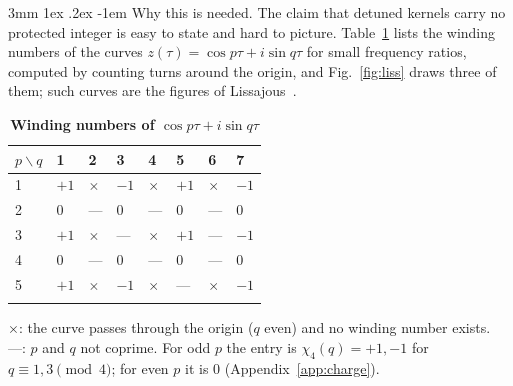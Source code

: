 \documentclass[%
 reprint, amsmath,amssymb, aps, prb, ]{revtex4-2}
\makeatletter
\numberwithin{equation}{section}
\renewcommand\paragraph{%
  \@startsection{paragraph}{4}{\z@}%
    {3mm \@plus 1ex \@minus .2ex}
    {-1em}
    {\normalfont\normalsize\itshape}}
\makeatother
\begin{document}
\paragraph{Why this is needed.} The claim that detuned kernels carry no protected integer is easy to state and hard to picture. Table~\ref{tab:wind} lists the winding numbers of the curves $z(\tau)=\cos p\tau+i\sin q\tau$ for small frequency ratios, computed by counting turns around the origin, and Fig.~\ref{fig:liss} draws three of them; such curves are the figures of Lissajous~\cite{ref:lissajous}.

\begin{table}[t!]
\centering
\caption{\textbf{Winding numbers of $\cos p\tau+i\sin q\tau$}}
\label{tab:wind}
\renewcommand{\arraystretch}{1.3}
\begin{tabular}{p{2.2cm}p{1.6cm}p{1.6cm}p{1.6cm}p{1.6cm}p{1.6cm}p{1.6cm}p{1.6cm}}
\toprule
$p\backslash q$ & 1 & 2 & 3 & 4 & 5 & 6 & 7 \\
\midrule
1 & $+1$ & $\times$ & $-1$ & $\times$ & $+1$ & $\times$ & $-1$ \\
2 & $0$ & --- & $0$ & --- & $0$ & --- & $0$ \\
3 & $+1$ & $\times$ & --- & $\times$ & $+1$ & --- & $-1$ \\
4 & $0$ & --- & $0$ & --- & $0$ & --- & $0$ \\
5 & $+1$ & $\times$ & $-1$ & $\times$ & --- & $\times$ & $-1$ \\
\addlinespace[0.1cm]
\bottomrule
\end{tabular}
\vspace{0.2cm}
\begin{minipage}{0.95\textwidth}
\justifying\footnotesize
$\times$: the curve passes through the origin ($q$ even) and no winding number exists. ---: $p$ and $q$ not coprime. For odd $p$ the entry is $\chi_4(q)=+1,-1$ for $q\equiv1,3\pmod4$; for even $p$ it is $0$ (Appendix~\ref{app:charge}).
\end{minipage}
\end{table}
\end{document}
